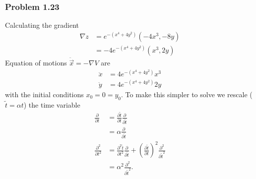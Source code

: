 \documentclass[10pt,a4paper]{book}
\theoremstyle{definition}
\begin{document}
\subsubsection{Problem 1.23}
Calculating the gradient
\begin{align}
\nabla z&=e^{-(x^4+4y^2)}(-4x^3,-8y)\\
&=-4e^{-(x^4+4y^2)}(x^3,2y)
\end{align}
Equation of motions $\ddot{\vec{x}}=-\nabla V$ are
\begin{align}
\ddot x&=4e^{-(x^4+4y^2)}x^3\\
\ddot y&=4e^{-(x^4+4y^2)}2y
\end{align}
with the initial conditions $x_0=0=y_0$. To make this simpler to solve we rescale ($\tilde t=\alpha t$) the time variable
\begin{align}
\frac{\partial}{\partial t}
&=\frac{\partial\tilde{t}}{\partial t}\frac{\partial}{\partial \tilde{t}}\\
&=\alpha\frac{\partial}{\partial \tilde{t}}\\
\frac{\partial^2}{\partial t^2}
&=\frac{\partial^2\tilde{t}}{\partial t^2}\frac{\partial}{\partial \tilde{t}}+\left(\frac{\partial\tilde{t}}{\partial t}\right)^2\frac{\partial^2}{\partial {\tilde t}^2}\\
&=\alpha^2\frac{\partial^2}{\partial {\tilde t}^2}.
\end{align}
\end{document}
